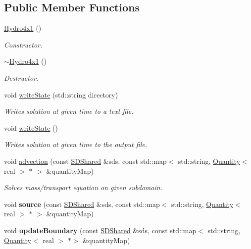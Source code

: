 \subsection*{Public Member Functions}
\begin{DoxyCompactItemize}
\item 
\mbox{\label{classHydro4x1_a9338034ca8db609008d30df744477b8a}} 
\mbox{\hyperlink{classHydro4x1_a9338034ca8db609008d30df744477b8a}{Hydro4x1}} ()
\begin{DoxyCompactList}\small\item\em Constructor. \end{DoxyCompactList}\item 
\mbox{\label{classHydro4x1_a13eab6c177e1e83a4f6528cb64e15374}} 
\mbox{\hyperlink{classHydro4x1_a13eab6c177e1e83a4f6528cb64e15374}{$\sim$\+Hydro4x1}} ()
\begin{DoxyCompactList}\small\item\em Destructor. \end{DoxyCompactList}\item 
void \mbox{\hyperlink{classHydro4x1_a3c0c4f4b9f96e257ec011173caaf7142}{write\+State}} (std\+::string directory)
\begin{DoxyCompactList}\small\item\em Writes solution at given time to a text file. \end{DoxyCompactList}\item 
void \mbox{\hyperlink{classHydro4x1_a776a3b1a53cca37f09e7bb883fa004b3}{write\+State}} ()
\begin{DoxyCompactList}\small\item\em Writes solution at given time to the output file. \end{DoxyCompactList}\item 
void \mbox{\hyperlink{classHydro4x1_a92400c7b09a487d0a91d003fb903bf01}{advection}} (const \mbox{\hyperlink{classSDShared}{S\+D\+Shared}} \&sds, const std\+::map$<$ std\+::string, \mbox{\hyperlink{classQuantity}{Quantity}}$<$ real $>$ $\ast$ $>$ \&quantity\+Map)
\begin{DoxyCompactList}\small\item\em Solves mass/transport equation on given subdomain. \end{DoxyCompactList}\item 
\mbox{\label{classHydro4x1_a02eea87f23013a5d8f292ee1e5a877f3}} 
void {\bfseries source} (const \mbox{\hyperlink{classSDShared}{S\+D\+Shared}} \&sds, const std\+::map$<$ std\+::string, \mbox{\hyperlink{classQuantity}{Quantity}}$<$ real $>$ $\ast$ $>$ \&quantity\+Map)
\item 
\mbox{\label{classHydro4x1_af909fbf65e4146d136712e8c5e23bb74}} 
void {\bfseries update\+Boundary} (const \mbox{\hyperlink{classSDShared}{S\+D\+Shared}} \&sds, const std\+::map$<$ std\+::string, \mbox{\hyperlink{classQuantity}{Quantity}}$<$ real $>$ $\ast$$>$ \&quantity\+Map)
\end{DoxyCompactItemize}
